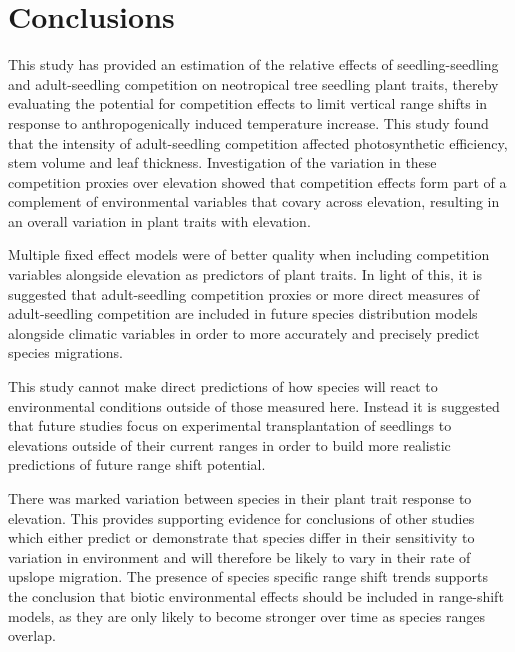 \documentclass[a4paper,10pt,]{report}
\begin{document}
\chapter{Conclusions}
This study has provided an estimation of the relative effects of seedling-seedling and adult-seedling competition on neotropical tree seedling plant traits, thereby evaluating the potential for competition effects to limit vertical range shifts in response to anthropogenically induced temperature increase. This study found that the intensity of adult-seedling competition affected photosynthetic efficiency, stem volume and leaf thickness. Investigation of the variation in these competition proxies over elevation showed that competition effects form part of a complement of environmental variables that covary across elevation, resulting in an overall variation in plant traits with elevation.

Multiple fixed effect models were of better quality when including competition variables alongside elevation as predictors of plant traits. In light of this, it is suggested that adult-seedling competition proxies or more direct measures of adult-seedling competition are included in future species distribution models alongside climatic variables in order to more accurately and precisely predict species migrations.

This study cannot make direct predictions of how species will react to environmental conditions outside of those measured here. Instead it is suggested that future studies focus on experimental transplantation of seedlings to elevations outside of their current ranges in order to build more realistic predictions of future range shift potential. 

There was marked variation between species in their plant trait response to elevation. This provides supporting evidence for conclusions of other studies which either predict or demonstrate that species differ in their sensitivity to variation in environment and will therefore be likely to vary in their rate of upslope migration. The presence of species specific range shift trends supports the conclusion that biotic environmental effects should be included in range-shift models, as they are only likely to become stronger over time as species ranges overlap.



\clearpage
\singlespacing


\clearpage
\end{document}

